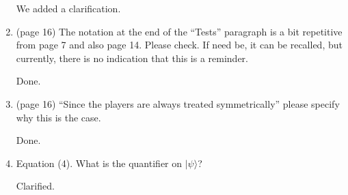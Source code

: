 \documentclass[12pt]{article}
\begin{document}
\begin{enumerate}
{\color{blue} We added a clarification.}

 \item (page 16) The notation at the end of the ``Tests'' paragraph is a bit repetitive from page 7 and also page 14. Please check. If need be, it can be recalled, but currently, there is no indication that this is a reminder.

{\color{blue} Done.}

 \item (page 16) ``Since the players are always treated symmetrically'' please specify why this is the case.

{\color{blue} Done.}

 \item Equation (4). What is the quantifier on $|\psi\rangle$?

{\color{blue} Clarified.}


\end{enumerate}
\end{document}
